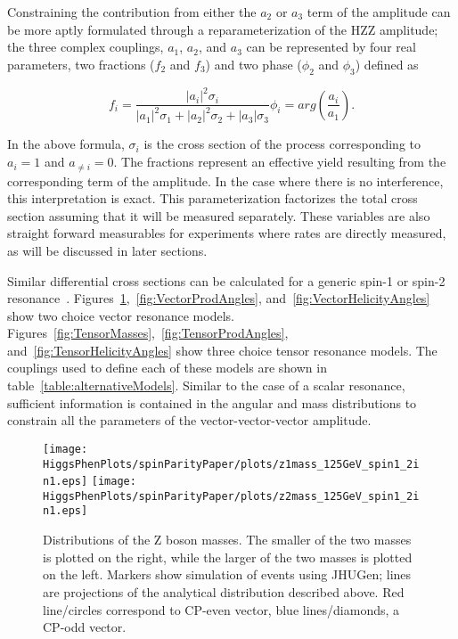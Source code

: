 Constraining the contribution
from either the $a_2$ or $a_3$ term of the amplitude can be more aptly 
formulated through a reparameterization of the HZZ amplitude; the 
three complex couplings, $a_1$, $a_2$, and $a_3$ can be represented by
four real parameters, two fractions ($f_2$ and $f_3$) and two phase 
($\phi_2$ and $\phi_3$) defined as
\begin{center}
\begin{subequations}
  \begin{equation}
    f_i = \frac{|a_i|^2\sigma_i }{|a_1|^2\sigma_1+|a_2|^2\sigma_2+|a_3|\sigma_3}
    \end{equation}
  \begin{equation}
    \phi_i = arg(\frac{a_i}{a_1}).
    \end{equation}
\label{eq:HZZmodelParams}
\end{subequations}
\end{center}
In the above formula, $\sigma_i$ is the cross section of the process 
corresponding
to $a_i=1$ and $a_{\neq i}=0$.  The fractions represent an effective yield 
resulting from the corresponding term of the amplitude.  In the case where
there is no interference, this interpretation is exact.  This parameterization
factorizes the total cross section assuming that it will be measured separately.
These variables
are also straight forward measurables for experiments where rates are 
directly measured, as will be discussed in later sections.  

Similar differential cross sections can be calculated for a generic spin-1 or spin-2 
resonance~\cite{Bolognesi:2012mm}.  
Figures~\ref{fig:VectorMasses},~\ref{fig:VectorProdAngles}, 
and~\ref{fig:VectorHelicityAngles} show two choice vector 
resonance models.  
Figures~\ref{fig:TensorMasses},~\ref{fig:TensorProdAngles}, 
and~\ref{fig:TensorHelicityAngles}
show three choice tensor 
resonance models.  The couplings used to define each of these models are shown in table~\ref{table:alternativeModels}.  Similar to the case of a scalar resonance, sufficient
information is contained in the angular and mass distributions to 
constrain all the parameters of the vector-vector-vector amplitude. 

\begin{figure}
\begin{center}
\texttt{[image: HiggsPhenPlots/spinParityPaper/plots/z1mass\_125GeV\_spin1\_2in1.eps]}
\texttt{[image: HiggsPhenPlots/spinParityPaper/plots/z2mass\_125GeV\_spin1\_2in1.eps]}
\caption{Distributions of the Z boson masses.  The smaller of the two masses is
plotted on the right, while the larger of the two masses is plotted on the
left. Markers show simulation of events using JHUGen; lines are projections
of the analytical distribution described above.  Red line/circles correspond
to CP-even vector, blue lines/diamonds, a CP-odd vector.}
\label{fig:VectorMasses}
\end{center}
\end{figure}

